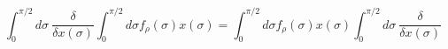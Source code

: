 \begin{equation}\int_{0}^{\pi/2}d\sigma\ \frac{\delta}{\delta
x(\sigma)}\int_0^{\pi/2}d\sigma
f_\rho(\sigma)x(\sigma)=\int_0^{\pi/2}d\sigma
f_\rho(\sigma)x(\sigma) \int_{0}^{\pi/2}d\sigma\
\frac{\delta}{\delta x(\sigma)}\label{com_int}\end{equation}

